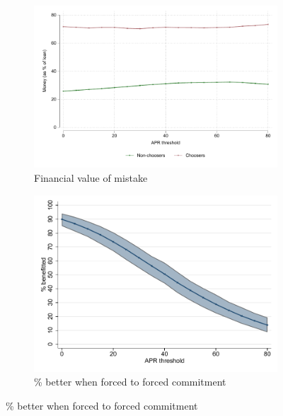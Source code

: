 \documentclass[oneside,11pt]{article}
\begin{document}
{\begin{figure}[H]
\begin{center}
\begin{subfigure}{0.45\textwidth}
    \end{subfigure}
        \begin{subfigure}{0.45\textwidth}
        \caption{Financial value of mistake}
        \centering
        \includegraphics[width=\textwidth]{Figuras/money_cw_apr_tot_tut.pdf}

    \bigskip
        
    \end{subfigure}
        \begin{subfigure}{0.45\textwidth}
        \caption{\% better when forced to forced commitment}
        \centering
        \includegraphics[width=\textwidth]{Figuras/line_better_forceall_apr_te_cf.pdf}
        
    \end{subfigure}
    

\end{center}
\end{figure}}
\end{document}
